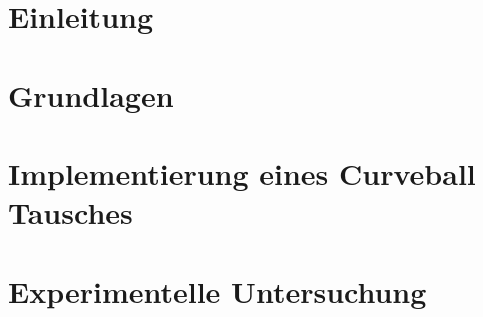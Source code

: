\documentclass[a4paper,twoside, 11pt, openright]{scrbook}
\theoremstyle{plain} %
\theoremstyle{definition} %
\newcommand{\ct}{Curveball Tausch}
\begin{document}
\chapter{Einleitung}






\chapter{Grundlagen}








\chapter{Implementierung eines \ct{es} }





\chapter{Experimentelle Untersuchung}



\end{document}
